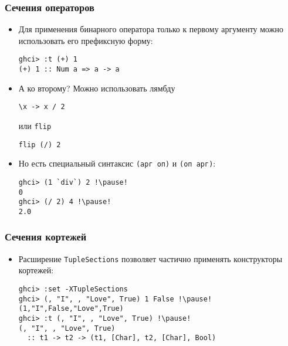\documentclass[10pt]{beamer}
\begin{document}
\begin{frame}[fragile]
  \frametitle{Сечения операторов}
  \begin{itemize}
    \item Для применения бинарного оператора только к первому аргументу можно использовать его префиксную форму:
          \begin{lstlisting}
ghci> :t (+) 1
(+) 1 :: Num a => a -> a
\end{lstlisting}\pause
    \item А ко второму? Можно использовать лямбду
          \begin{lstlisting}
\x -> x / 2
\end{lstlisting}
          или \lstinline|flip|
          \begin{lstlisting}
flip (/) 2
\end{lstlisting}\pause
    \item Но есть специальный синтаксис \lstinline|(арг оп)| и \lstinline|(оп арг)|:
          \begin{lstlisting}
ghci> (1 `div`) 2 !\pause!
0
ghci> (/ 2) 4 !\pause!
2.0
\end{lstlisting}
  \end{itemize}
\end{frame}

\begin{frame}[fragile]
  \frametitle{Сечения кортежей}
  \begin{itemize}
    \item Расширение \lstinline|TupleSections| позволяет частично применять конструкторы кортежей:
          \begin{lstlisting}
ghci> :set -XTupleSections
ghci> (, "I", , "Love", True) 1 False !\pause!
(1,"I",False,"Love",True)
ghci> :t (, "I", , "Love", True) !\pause!
(, "I", , "Love", True)
  :: t1 -> t2 -> (t1, [Char], t2, [Char], Bool)
\end{lstlisting}
  \end{itemize}
\end{frame}
\end{document}
